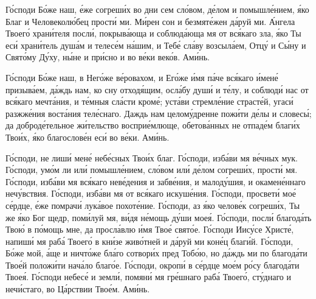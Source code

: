 \begin{mymulticols}

Г\'{о}споди Б\'{о}же наш, \'{е}же согреш\'{и}х во дни сем сл\'{о}вом, д\'{е}лом и помышл\'{е}нием, \'{я}ко Благ и Человекол\'{ю}бец прост\'{и} ми. М\'{и}рен сон и безмят\'{е}жен д\'{а}руй ми. \'{А}нгела Твоег\'{о} хран\'{и}теля посл\'{и}, покрыв\'{а}юща и соблюд\'{а}юща мя от вс\'{я}каго зла, \'{я}ко Ты ес\'{и} хран\'{и}тель душ\'{а}м и телес\'{е}м н\'{а}шим, и Теб\'{е} сл\'{а}ву возсыл\'{а}ем, Отц\'{у} и С\'{ы}ну и Свят\'{о}му Д\'{у}ху, н\'{ы}не и пр\'{и}сно и во в\'{е}ки век\'{о}в. Ам\'{и}нь.


Г\'{о}споди Б\'{о}же наш, в Нег\'{о}же в\'{е}ровахом, и Ег\'{о}же \'{и}мя п\'{а}че вс\'{я}каго \'{и}мен\'{е} призыв\'{а}ем, д\'{а}ждь нам, ко сну отход\'{я}щим, осл\'{а}бу душ\'{и} и т\'{е}лу, и соблюд\'{и} нас от вс\'{я}каго мечт\'{а}ния, и т\'{е}мныя сл\'{а}сти кром\'{е}; уст\'{а}ви стремл\'{е}ние страст\'{е}й, угас\'{и} разжж\'{е}ния вост\'{а}ния тел\'{е}снаго. Даждь нам целом\'{у}дренне пож\'{и}ти д\'{е}лы и словес\'{ы}; да доброд\'{е}тельное ж\'{и}тельство воспри\'{е}млюще, обетов\'{а}нных не отпад\'{е}м благ\'{и}х Тво\'{и}х, \'{я}ко благослов\'{е}н ес\'{и} во в\'{е}ки. Ам\'{и}нь.


Г\'{о}споди, не лиш\'{и} мен\'{е} неб\'{е}сных Тво\'{и}х благ.
Г\'{о}споди, изб\'{а}ви мя в\'{е}чных мук.
Г\'{о}споди, ум\'{о}м ли ил\'{и} помышл\'{е}нием, сл\'{о}вом ил\'{и} д\'{е}лом согреш\'{и}х, прост\'{и} мя.
Г\'{о}споди, изб\'{а}ви мя вс\'{я}каго нев\'{е}дения и забв\'{е}ния, и малод\'{у}шия, и окамен\'{е}ннаго неч\'{у}вствия.
Г\'{о}споди, изб\'{а}ви мя от вс\'{я}каго искуш\'{е}ния.
Г\'{о}споди, просвет\'{и} мо\'{е} с\'{е}рдце, \'{е}же помрач\'{и} лук\'{а}вое похот\'{е}ние.
Г\'{о}споди, аз \'{я}ко челов\'{е}к согреш\'{и}х, Ты же \'{я}ко Бог щедр, пом\'{и}луй мя, в\'{и}дя н\'{е}мощь д\'{у}ши мое\'{я}.
Г\'{о}споди, посл\'{и} благод\'{а}ть Тво\'{ю} в п\'{о}мощь мне, да просл\'{а}влю \'{и}мя Тво\'{е} свят\'{о}е.
Г\'{о}споди Иис\'{у}се Христ\'{е}, напиш\'{и} мя раб\'{а} Твоег\'{о} в кн\'{и}зе жив\'{о}тней и д\'{а}руй ми кон\'{е}ц благ\'{и}й.
Г\'{о}споди, Б\'{о}же мой, \'{а}ще и ничт\'{о}же бл\'{а}го сотвор\'{и}х пред Тоб\'{о}ю, но д\'{а}ждь ми по благод\'{а}ти Тво\'{е}й полож\'{и}ти нач\'{а}ло благ\'{о}е.
Г\'{о}споди, окроп\'{и} в с\'{е}рдце мо\'{е}м р\'{о}су благод\'{а}ти Твое\'{я}.
Г\'{о}споди небес\'{е} и земл\'{и}, помян\'{и} мя гр\'{е}шнаго раб\'{а} Твоег\'{о}, ст\'{у}днаго и неч\'{и}стаго, во Ц\'{а}рствии Тво\'{е}м. Ам\'{и}нь.


\end{mymulticols}
